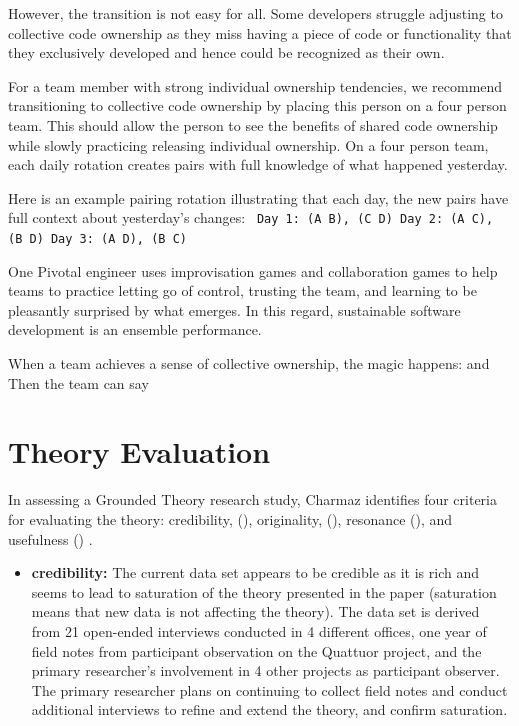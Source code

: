 \begin{table}[]
However, the transition is not easy for all. Some developers struggle adjusting to collective code ownership as they miss having a piece of code or functionality that they exclusively developed and hence could be recognized as their own.

For a team member with strong individual ownership tendencies, we recommend transitioning to collective code ownership by placing this person on a four person team. This should allow the person to see the benefits of shared code ownership while slowly practicing releasing individual ownership. On a four person team, each daily rotation creates pairs with full knowledge of what happened yesterday.  

Here is an example pairing rotation illustrating that each day, the new pairs have full context about yesterday's changes:
\texttt{
Day 1: (A B), (C D)
Day 2: (A C), (B D)
Day 3: (A D), (B C)
}

One Pivotal engineer uses improvisation games and collaboration games to help teams to practice letting go of control, trusting the team, and learning to be pleasantly surprised by what emerges. In this regard, sustainable software development is an ensemble performance. 

When a team achieves a sense of collective ownership, the magic happens:  and  Then the team can say 
\section{Theory Evaluation}
\label{TheoryEvaluation}

In assessing a Grounded Theory research study, Charmaz identifies four criteria for evaluating the theory: credibility, (), originality, (), resonance (), and usefulness () \cite{StolGTinSE}. 

\begin{itemize}
\item 
\textbf{credibility:}  The current data set appears to be credible as it is rich and seems to lead to saturation of the theory presented in the paper (saturation means that new data is not affecting the theory). The data set is derived from 21 open-ended interviews conducted in 4 different offices, one year of field notes from participant observation on the Quattuor project, and the primary researcher's involvement in 4 other projects as participant observer. The primary researcher plans on continuing to collect field notes and conduct additional interviews to refine and extend the theory, and confirm saturation.


\end{itemize}
\end{table}
